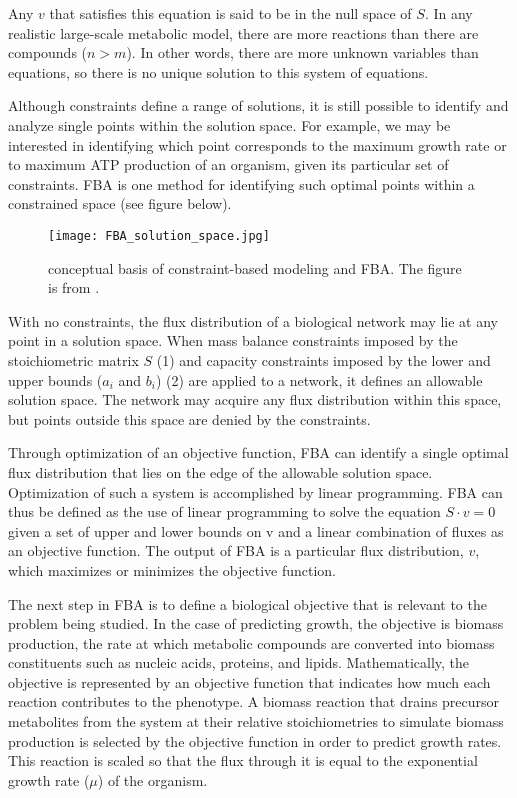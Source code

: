 Any $v$ that satisfies this equation is said to be in the null space of $S$. In any realistic 
large-scale metabolic model, there are more reactions than there are compounds ($n > m$). In other words, 
there are more unknown variables than equations, so there is no unique solution to this system of equations. \cite{Orth2010}

Although constraints define a range of solutions, it is still possible to identify
and analyze single points within the solution space. For example, we may be 
interested in identifying which point corresponds to the maximum growth rate 
or to maximum ATP production of an organism, given its particular set of 
constraints. FBA is one method for identifying such optimal points within a 
constrained space (see figure below). 

\begin{figure}[h]
    \texttt{[image: FBA\_solution\_space.jpg]}
    \caption{conceptual basis of constraint-based modeling and FBA. The figure is from \cite{Orth2010}.}
    \label{Solution space}
\end{figure}

With no constraints, the flux distribution of a 
biological network may lie at any point in a solution space. When mass balance constraints 
imposed by the stoichiometric matrix $S$ (1) and capacity constraints imposed by the lower and upper 
bounds ($a_i$ and $b_i$) (2) are applied to a network, it defines an allowable solution space. The network 
may acquire any flux distribution within this space, but points outside this space are denied by the 
constraints. 

Through optimization of an objective function, FBA can identify a single optimal flux distribution 
that lies on the edge of the allowable solution space. Optimization of such a system is accomplished by linear 
programming. FBA can thus be defined as the use of linear programming to solve the equation $S\cdot v = 0$ 
given a set of upper and lower bounds on v and a linear combination of fluxes as an objective function. 
The output of FBA is a particular flux distribution, $v$, which maximizes or minimizes the objective function. \cite{Orth2010}

The next step in FBA is to define a biological objective that is relevant to the problem being studied. 
In the case of predicting growth, the objective is biomass production, the rate at which metabolic compounds 
are converted into biomass constituents such as nucleic acids, proteins, and lipids. Mathematically, 
the objective is represented by an objective function that indicates how much each reaction contributes to the phenotype. 
A biomass reaction that drains precursor metabolites from the system at their relative stoichiometries to simulate biomass production is 
selected by the objective function in order to predict growth rates. This reaction is scaled so that the flux through it is equal 
to the exponential growth rate ($\mu$) of the organism.  \cite{Orth2010}

